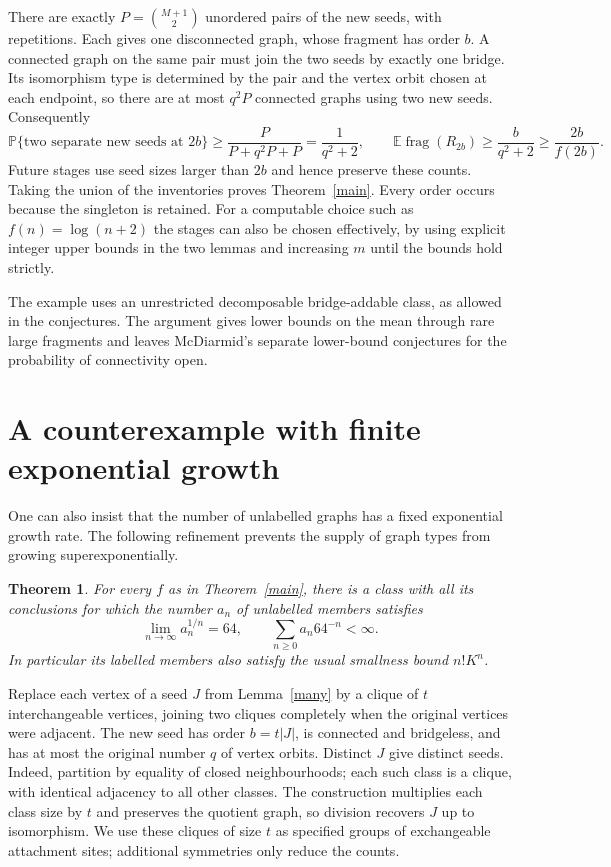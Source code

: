 \documentclass[11pt]{article}
\newtheorem{theorem}{Theorem}
\newcommand{\frag}{\operatorname{frag}}
\begin{document}
There are exactly $P=\binom{M+1}{2}$ unordered pairs of the new seeds, with repetitions. Each gives one disconnected graph, whose fragment has order $b$. A connected graph on the same pair must join the two seeds by exactly one bridge. Its isomorphism type is determined by the pair and the vertex orbit chosen at each endpoint, so there are at most $q^2P$ connected graphs using two new seeds. Consequently
\[
 \mathbb P\{\text{two separate new seeds at }2b\}
 \ge \frac{P}{P+q^2P+P}=\frac1{q^2+2},
 \qquad
 \mathbb E\frag(R_{2b})\ge\frac{b}{q^2+2}\ge\frac{2b}{f(2b)}.
\]
Future stages use seed sizes larger than $2b$ and hence preserve these counts. Taking the union of the inventories proves Theorem~\ref{main}. Every order occurs because the singleton is retained. For a computable choice such as $f(n)=\log(n+2)$ the stages can also be chosen effectively, by using explicit integer upper bounds in the two lemmas and increasing $m$ until the bounds hold strictly.

The example uses an unrestricted decomposable bridge-addable class, as allowed in the conjectures. The argument gives lower bounds on the mean through rare large fragments and leaves McDiarmid's separate lower-bound conjectures for the probability of connectivity open.


\section{A counterexample with finite exponential growth}
One can also insist that the number of unlabelled graphs has a fixed exponential growth rate. The following refinement prevents the supply of graph types from growing superexponentially.
\begin{theorem}\label{small}
For every $f$ as in Theorem~\ref{main}, there is a class with all its conclusions for which the number $a_n$ of unlabelled members satisfies
\[
 \lim_{n\to\infty}a_n^{1/n}=64,\qquad
 \sum_{n\ge0}a_n64^{-n}<\infty.
\]
In particular its labelled members also satisfy the usual smallness bound $n!K^n$.
\end{theorem}

Replace each vertex of a seed $J$ from Lemma~\ref{many} by a clique of $t$ interchangeable vertices, joining two cliques completely when the original vertices were adjacent. The new seed has order $b=t|J|$, is connected and bridgeless, and has at most the original number $q$ of vertex orbits. Distinct $J$ give distinct seeds. Indeed, partition by equality of closed neighbourhoods; each such class is a clique, with identical adjacency to all other classes. The construction multiplies each class size by $t$ and preserves the quotient graph, so division recovers $J$ up to isomorphism. We use these cliques of size $t$ as specified groups of exchangeable attachment sites; additional symmetries only reduce the counts.
\end{document}
